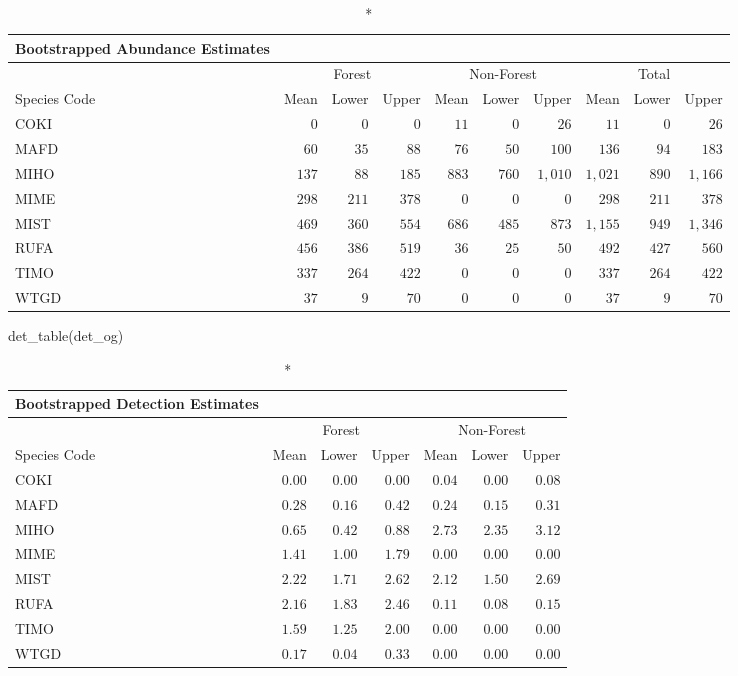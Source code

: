 \documentclass[
]{article}
\newenvironment{Shaded}{\begin{snugshade}}{\end{snugshade}}
\newcommand{\FunctionTok}[1]{\textcolor[rgb]{0.00,0.00,0.00}{#1}}
\newcommand{\NormalTok}[1]{#1}
\begin{document}
\begin{longtable}{lrrrrrrrrr}
\caption*{
{\large Bootstrapped Abundance Estimates}
} \\ 
\toprule
 & \multicolumn{3}{c}{Forest} & \multicolumn{3}{c}{Non-Forest} & \multicolumn{3}{c}{Total} \\ 
\cmidrule(lr){2-4} \cmidrule(lr){5-7} \cmidrule(lr){8-10}
Species Code & Mean & Lower & Upper & Mean & Lower & Upper & Mean & Lower & Upper \\ 
\midrule
COKI & $0$ & $0$ & $0$ & $11$ & $0$ & $26$ & $11$ & $0$ & $26$ \\ 
MAFD & $60$ & $35$ & $88$ & $76$ & $50$ & $100$ & $136$ & $94$ & $183$ \\ 
MIHO & $137$ & $88$ & $185$ & $883$ & $760$ & $1,010$ & $1,021$ & $890$ & $1,166$ \\ 
MIME & $298$ & $211$ & $378$ & $0$ & $0$ & $0$ & $298$ & $211$ & $378$ \\ 
MIST & $469$ & $360$ & $554$ & $686$ & $485$ & $873$ & $1,155$ & $949$ & $1,346$ \\ 
RUFA & $456$ & $386$ & $519$ & $36$ & $25$ & $50$ & $492$ & $427$ & $560$ \\ 
TIMO & $337$ & $264$ & $422$ & $0$ & $0$ & $0$ & $337$ & $264$ & $422$ \\ 
WTGD & $37$ & $9$ & $70$ & $0$ & $0$ & $0$ & $37$ & $9$ & $70$ \\ 
\bottomrule
\end{longtable}

\begin{Shaded}
\begin{Highlighting}[]
\FunctionTok{det\_table}\NormalTok{(det\_og)}
\end{Highlighting}
\end{Shaded}

\begin{longtable}{lrrrrrr}
\caption*{
{\large Bootstrapped Detection Estimates}
} \\ 
\toprule
 & \multicolumn{3}{c}{Forest} & \multicolumn{3}{c}{Non-Forest} \\ 
\cmidrule(lr){2-4} \cmidrule(lr){5-7}
Species Code & Mean & Lower & Upper & Mean & Lower & Upper \\ 
\midrule
COKI & $0.00$ & $0.00$ & $0.00$ & $0.04$ & $0.00$ & $0.08$ \\ 
MAFD & $0.28$ & $0.16$ & $0.42$ & $0.24$ & $0.15$ & $0.31$ \\ 
MIHO & $0.65$ & $0.42$ & $0.88$ & $2.73$ & $2.35$ & $3.12$ \\ 
MIME & $1.41$ & $1.00$ & $1.79$ & $0.00$ & $0.00$ & $0.00$ \\ 
MIST & $2.22$ & $1.71$ & $2.62$ & $2.12$ & $1.50$ & $2.69$ \\ 
RUFA & $2.16$ & $1.83$ & $2.46$ & $0.11$ & $0.08$ & $0.15$ \\ 
TIMO & $1.59$ & $1.25$ & $2.00$ & $0.00$ & $0.00$ & $0.00$ \\ 
WTGD & $0.17$ & $0.04$ & $0.33$ & $0.00$ & $0.00$ & $0.00$ \\ 
\bottomrule
\end{longtable}
\end{document}
